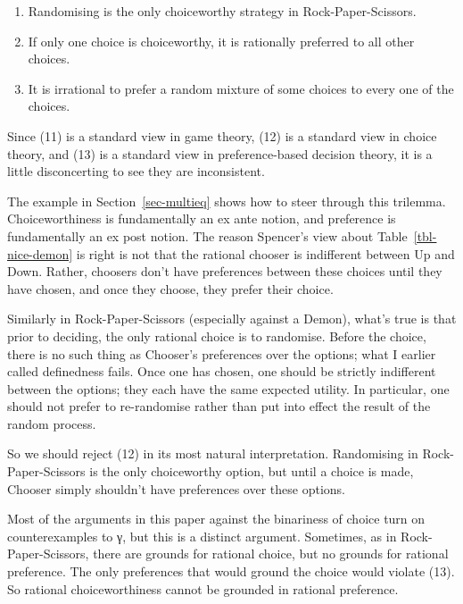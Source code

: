 \documentclass[
  11pt,
  letterpaper,
  DIV=11,
  numbers=noendperiod,
  twoside]{scrartcl}
\providecommand{\tightlist}{%
  \setlength{\itemsep}{0pt}\setlength{\parskip}{0pt}}
\begin{document}
\begin{enumerate}
\def\labelenumi{(\arabic{enumi})}
\setcounter{enumi}{10}
\tightlist
\item
  Randomising is the only choiceworthy strategy in Rock-Paper-Scissors.
\item
  If only one choice is choiceworthy, it is rationally preferred to all
  other choices.
\item
  It is irrational to prefer a random mixture of some choices to every
  one of the choices.
\end{enumerate}

Since (11) is a standard view in game theory, (12) is a standard view in
choice theory, and (13) is a standard view in preference-based decision
theory, it is a little disconcerting to see they are inconsistent.

The example in Section~\ref{sec-multieq} shows how to steer through this
trilemma. Choiceworthiness is fundamentally an ex ante notion, and
preference is fundamentally an ex post notion. The reason Spencer's view
about Table~\ref{tbl-nice-demon} is right is not that the rational
chooser is indifferent between Up and Down. Rather, choosers don't have
preferences between these choices until they have chosen, and once they
choose, they prefer their choice.

Similarly in Rock-Paper-Scissors (especially against a Demon), what's
true is that prior to deciding, the only rational choice is to
randomise. Before the choice, there is no such thing as Chooser's
preferences over the options; what I earlier called definedness fails.
Once one has chosen, one should be strictly indifferent between the
options; they each have the same expected utility. In particular, one
should not prefer to re-randomise rather than put into effect the result
of the random process.

So we should reject (12) in its most natural interpretation. Randomising
in Rock-Paper-Scissors is the only choiceworthy option, but until a
choice is made, Chooser simply shouldn't have preferences over these
options.

Most of the arguments in this paper against the binariness of choice
turn on counterexamples to γ, but this is a distinct argument.
Sometimes, as in Rock-Paper-Scissors, there are grounds for rational
choice, but no grounds for rational preference. The only preferences
that would ground the choice would violate (13). So rational
choiceworthiness cannot be grounded in rational preference.
\end{document}
